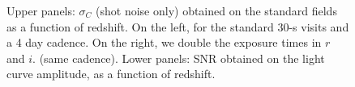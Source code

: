 \documentclass[\docopts]{\docclass}
\begin{document}
\begin{figure}[t]
\begin{center}
\end{center}
\caption{Upper panels: $\sigma_C$ (shot noise only) obtained on the
  standard fields as a function of redshift.  On the left, for the
  standard 30-s visits and a 4 day cadence. On the right, we double
  the exposure times in $r$ and $i$.  (same cadence).  Lower panels:
  SNR obtained on the light curve amplitude, as a function of
  redshift.}
\label{fig:sigc_vs_z_wide}
\end{figure}
\end{document}
